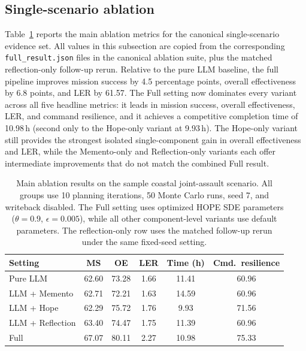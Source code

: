 \subsection{Single-scenario ablation}

Table~\ref{tab:ablation-main} reports the main ablation metrics for the canonical single-scenario evidence set. All values in this subsection are copied from the corresponding \texttt{full\_result.json} files in the canonical ablation suite, plus the matched reflection-only follow-up rerun. Relative to the pure LLM baseline, the full pipeline improves mission success by 4.5 percentage points, overall effectiveness by 6.8 points, and LER by 61.57. The Full setting now dominates every variant across all five headline metrics: it leads in mission success, overall effectiveness, LER, and command resilience, and it achieves a competitive completion time of 10.98\,h (second only to the Hope-only variant at 9.93\,h). The Hope-only variant still provides the strongest isolated single-component gain in overall effectiveness and LER, while the Memento-only and Reflection-only variants each offer intermediate improvements that do not match the combined Full result.

\begin{table}[ht]
\centering
\caption{Main ablation results on the sample coastal joint-assault scenario. All groups use 10 planning iterations, 50 Monte Carlo runs, seed 7, and writeback disabled. The Full setting uses optimized HOPE SDE parameters ($\theta=0.9$, $\epsilon=0.005$), while all other component-level variants use default parameters. The reflection-only row uses the matched follow-up rerun under the same fixed-seed setting.}
\label{tab:ablation-main}
\small
\setlength{\tabcolsep}{3.2pt}
\begin{tabular}{lccccc}
\toprule
Setting & MS & OE & LER & Time (h) & Cmd.\ resilience \\
\midrule
Pure LLM & 62.60 & 73.28 & 1.66 & 11.41 & 60.96 \\
LLM + Memento & 62.71 & 72.21 & 1.63 & 14.59 & 60.96 \\
LLM + Hope & 62.29 & 75.72 & 1.76 & 9.93 & 71.56 \\
LLM + Reflection & 63.40 & 74.47 & 1.75 & 11.39 & 60.96 \\
Full & 67.07 & 80.11 & 2.27 & 10.98 & 75.33 \\
\bottomrule
\end{tabular}
\end{table}

